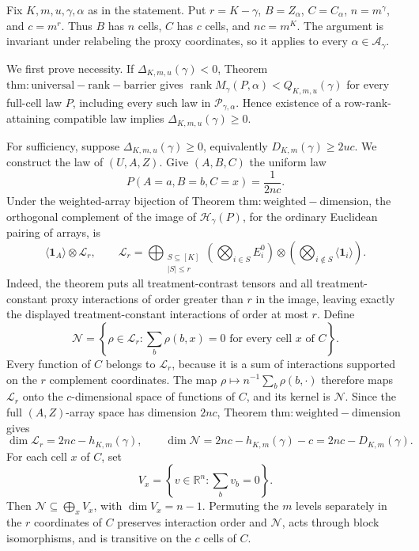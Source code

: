 Fix \(K,m,u,\gamma,\alpha\) as in the statement. Put \(r=K-\gamma\), \(B=Z_\alpha\), \(C=C_\alpha\), \(n=m^\gamma\), and \(c=m^r\). Thus \(B\) has \(n\) cells, \(C\) has \(c\) cells, and \(nc=m^K\). The argument is invariant under relabeling the proxy coordinates, so it applies to every \(\alpha\in\mathcal A_\gamma\).

We first prove necessity. If \(\Delta_{K,m,u}(\gamma)<0\), Theorem \(\mathrm{thm:universal-rank-barrier}\) gives \(\operatorname{rank}M_\gamma(P,\alpha)<Q_{K,m,u}(\gamma)\) for every full-cell law \(P\), including every such law in \(\mathcal P_{\gamma,\alpha}\). Hence existence of a row-rank-attaining compatible law implies \(\Delta_{K,m,u}(\gamma)\ge0\).

For sufficiency, suppose \(\Delta_{K,m,u}(\gamma)\ge0\), equivalently \(D_{K,m}(\gamma)\ge2uc\). We construct the law of \((U,A,Z)\). Give \((A,B,C)\) the uniform law
\[P(A=a,B=b,C=x)=\frac{1}{2nc}.\]
Under the weighted-array bijection of Theorem \(\mathrm{thm:weighted-dimension}\), the orthogonal complement of the image of \(\mathcal H_\gamma(P)\), for the ordinary Euclidean pairing of arrays, is
\[\langle\mathbf 1_A\rangle\otimes\mathcal L_r,\qquad \mathcal L_r=\bigoplus_{\substack{S\subseteq[K]\\ |S|\le r}}\left(\bigotimes_{i\in S}E_i^0\right)\otimes\left(\bigotimes_{i\notin S}\langle\mathbf 1_i\rangle\right).\]
Indeed, the theorem puts all treatment-contrast tensors and all treatment-constant proxy interactions of order greater than \(r\) in the image, leaving exactly the displayed treatment-constant interactions of order at most \(r\). Define
\[\mathcal N=\left\{\rho\in\mathcal L_r:\sum_b\rho(b,x)=0\text{ for every cell }x\text{ of }C\right\}.\]
Every function of \(C\) belongs to \(\mathcal L_r\), because it is a sum of interactions supported on the \(r\) complement coordinates. The map \(\rho\mapsto n^{-1}\sum_b\rho(b,\cdot)\) therefore maps \(\mathcal L_r\) onto the \(c\)-dimensional space of functions of \(C\), and its kernel is \(\mathcal N\). Since the full \((A,Z)\)-array space has dimension \(2nc\), Theorem \(\mathrm{thm:weighted-dimension}\) gives
\[\dim\mathcal L_r=2nc-h_{K,m}(\gamma),\qquad \dim\mathcal N=2nc-h_{K,m}(\gamma)-c=2nc-D_{K,m}(\gamma).\]
For each cell \(x\) of \(C\), set
\[V_x=\left\{v\in\mathbb R^n:\sum_bv_b=0\right\}.\]
Then \(\mathcal N\subseteq\bigoplus_xV_x\), with \(\dim V_x=n-1\). Permuting the \(m\) levels separately in the \(r\) coordinates of \(C\) preserves interaction order and \(\mathcal N\), acts through block isomorphisms, and is transitive on the \(c\) cells of \(C\).

